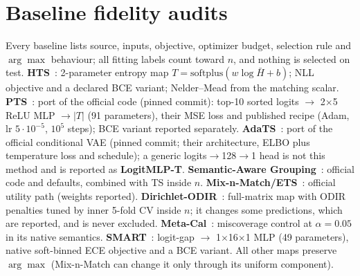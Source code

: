 \documentclass[sigconf,anonymous,review]{acmart}
\begin{document}
\section{Baseline fidelity audits}
\label{app:fidelity}
Every baseline lists source, inputs, objective, optimizer budget,
selection rule and $\arg\max$ behaviour; all fitting labels count toward
$n$, and nothing is selected on test. \textbf{HTS}~\cite{balanya2024adaptive}: 2-parameter entropy
map $T=\mathrm{softplus}(w\log\bar H+b)$; NLL objective and a declared BCE
variant; Nelder--Mead from the matching scalar.
\textbf{PTS}~\cite{tomani2022pts}: port of the official code (pinned
commit): top-10 sorted logits $\to$ 2$\times$5 ReLU MLP $\to|T|$ (91
parameters), their MSE loss and published recipe (Adam, lr
$5{\cdot}10^{-5}$, $10^5$ steps); BCE variant reported separately.
\textbf{AdaTS}~\cite{joy2023sample}: port of the official conditional VAE
(pinned commit; their architecture, ELBO plus temperature loss and
schedule); a generic logits$\to$128$\to$1 head is not this method and is
reported as \textbf{LogitMLP-T}. \textbf{Semantic-Aware
Grouping}~\cite{yang2023semantic}: official code and defaults, combined
with TS inside $n$. \textbf{Mix-n-Match/ETS}~\cite{zhang2020mixnmatch}:
official utility path (weights reported).
\textbf{Dirichlet-ODIR}~\cite{kull2019dirichlet}: full-matrix map with
ODIR penalties tuned by inner 5-fold CV inside $n$; it changes some
predictions, which are reported, and is never excluded.
\textbf{Meta-Cal}~\cite{ma2021metacal}: miscoverage control at
$\alpha{=}0.05$ in its native semantics. \textbf{SMART}~\cite{guo2026smart}:
logit-gap $\to$ 1$\times$16$\times$1 MLP (49 parameters), native
soft-binned ECE objective and a BCE variant. All other maps preserve
$\arg\max$ (Mix-n-Match can change it only through its uniform
component).
\end{document}
